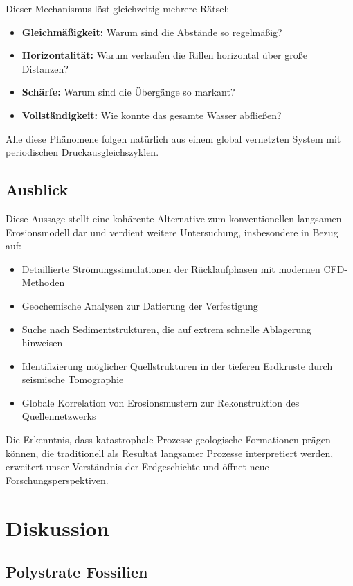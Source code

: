 ﻿\documentclass[12pt,a4paper]{report}
\begin{document}
Dieser Mechanismus löst gleichzeitig mehrere Rätsel:
\begin{itemize}
	\item \textbf{Gleichmäßigkeit:} Warum sind die Abstände so regelmäßig?
	\item \textbf{Horizontalität:} Warum verlaufen die Rillen horizontal über große Distanzen?
	\item \textbf{Schärfe:} Warum sind die Übergänge so markant?
	\item \textbf{Vollständigkeit:} Wie konnte das gesamte Wasser abfließen?
\end{itemize}

Alle diese Phänomene folgen natürlich aus einem global vernetzten System mit periodischen Druckausgleichszyklen.

\section{Ausblick}

Diese Aussage stellt eine kohärente Alternative zum konventionellen langsamen Erosionsmodell dar und verdient weitere Untersuchung, insbesondere in Bezug auf:

\begin{itemize}
	\item Detaillierte Strömungssimulationen der Rücklaufphasen mit modernen CFD-Metho\-den
	\item Geochemische Analysen zur Datierung der Verfestigung
	\item Suche nach Sedimentstrukturen, die auf extrem schnelle Ablagerung hinweisen
	\item Identifizierung möglicher Quellstrukturen in der tieferen Erdkruste durch seismische Tomographie
	\item Globale Korrelation von Erosionsmustern zur Rekonstruktion des Quellennetzwerks
\end{itemize}

Die Erkenntnis, dass katastrophale Prozesse geologische Formationen prägen können, die traditionell als Resultat langsamer Prozesse interpretiert werden, erweitert unser Verständnis der Erdgeschichte und öffnet neue Forschungsperspektiven.

\chapter{Diskussion}

\section{Polystrate Fossilien}
\end{document}
